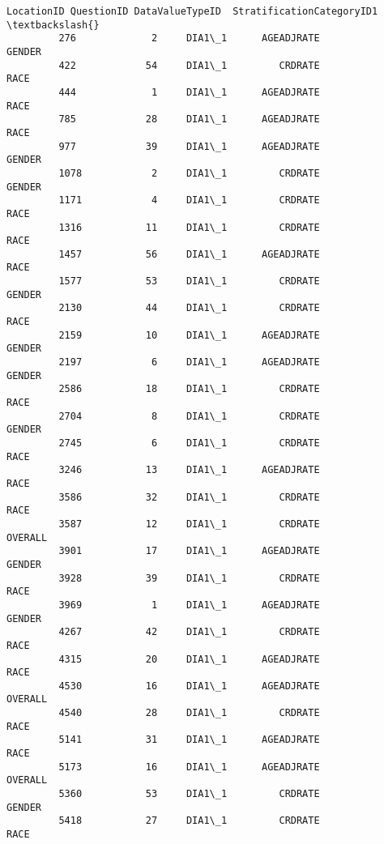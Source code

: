\documentclass[11pt]{article}
\begin{document}
\begin{Verbatim}[commandchars=\\\{\}]
                LocationID QuestionID DataValueTypeID  StratificationCategoryID1  \textbackslash{}
         276             2     DIA1\_1      AGEADJRATE                     GENDER   
         422            54     DIA1\_1         CRDRATE                       RACE   
         444             1     DIA1\_1      AGEADJRATE                       RACE   
         785            28     DIA1\_1      AGEADJRATE                       RACE   
         977            39     DIA1\_1      AGEADJRATE                     GENDER   
         1078            2     DIA1\_1         CRDRATE                     GENDER   
         1171            4     DIA1\_1         CRDRATE                       RACE   
         1316           11     DIA1\_1         CRDRATE                       RACE   
         1457           56     DIA1\_1      AGEADJRATE                       RACE   
         1577           53     DIA1\_1         CRDRATE                     GENDER   
         2130           44     DIA1\_1         CRDRATE                       RACE   
         2159           10     DIA1\_1      AGEADJRATE                     GENDER   
         2197            6     DIA1\_1      AGEADJRATE                     GENDER   
         2586           18     DIA1\_1         CRDRATE                       RACE   
         2704            8     DIA1\_1         CRDRATE                     GENDER   
         2745            6     DIA1\_1         CRDRATE                       RACE   
         3246           13     DIA1\_1      AGEADJRATE                       RACE   
         3586           32     DIA1\_1         CRDRATE                       RACE   
         3587           12     DIA1\_1         CRDRATE                    OVERALL   
         3901           17     DIA1\_1      AGEADJRATE                     GENDER   
         3928           39     DIA1\_1         CRDRATE                       RACE   
         3969            1     DIA1\_1      AGEADJRATE                     GENDER   
         4267           42     DIA1\_1         CRDRATE                       RACE   
         4315           20     DIA1\_1      AGEADJRATE                       RACE   
         4530           16     DIA1\_1      AGEADJRATE                    OVERALL   
         4540           28     DIA1\_1         CRDRATE                       RACE   
         5141           31     DIA1\_1      AGEADJRATE                       RACE   
         5173           16     DIA1\_1      AGEADJRATE                    OVERALL   
         5360           53     DIA1\_1         CRDRATE                     GENDER   
         5418           27     DIA1\_1         CRDRATE                       RACE   

\end{Verbatim}
\end{document}
